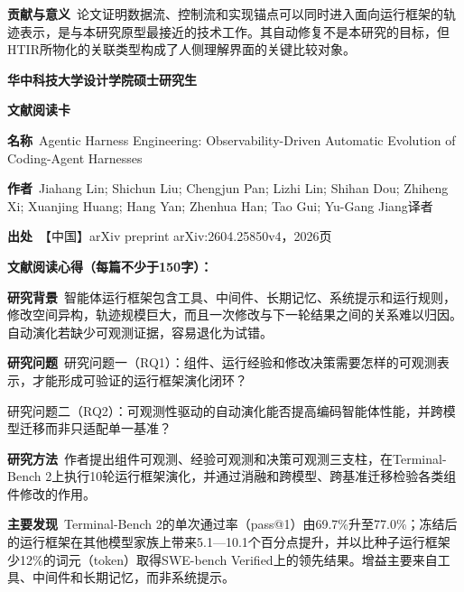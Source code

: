 \noindent\textbf{贡献与意义}\ 论文证明数据流、控制流和实现锚点可以同时进入面向运行框架的轨迹表示，是与本研究原型最接近的技术工作。其自动修复不是本研究的目标，但HTIR所物化的关联类型构成了人侧理解界面的关键比较对象。\par
\clearpage
\begin{center}
{\songti\bfseries\fontsize{18.5pt}{27.75pt}\selectfont 华中科技大学设计学院硕士研究生\par}
{\songti\bfseries\fontsize{18.5pt}{27.75pt}\selectfont 文献阅读卡\par}
\end{center}
\vspace{0.25em}
\noindent\underline{}\par
\vspace{0.35em}
\noindent\textbf{名称}\ Agentic Harness Engineering: Observability-Driven Automatic Evolution of Coding-Agent Harnesses\par
\noindent\textbf{作者}\ Jiahang Lin; Shichun Liu; Chengjun Pan; Lizhi Lin; Shihan Dou; Zhiheng Xi; Xuanjing Huang; Hang Yan; Zhenhua Han; Tao Gui; Yu-Gang Jiang\quad 译者\par
\noindent\textbf{出处}\ 【中国】arXiv preprint arXiv:2604.25850v4，2026\quad 页\par
\vspace{0.35em}
\noindent\textbf{文献阅读心得（每篇不少于150字）：}\par
\noindent\textbf{研究背景}\ 智能体运行框架包含工具、中间件、长期记忆、系统提示和运行规则，修改空间异构，轨迹规模巨大，而且一次修改与下一轮结果之间的关系难以归因。自动演化若缺少可观测证据，容易退化为试错。\par
\noindent\textbf{研究问题}\ 研究问题一（RQ1）：组件、运行经验和修改决策需要怎样的可观测表示，才能形成可验证的运行框架演化闭环？\par
研究问题二（RQ2）：可观测性驱动的自动演化能否提高编码智能体性能，并跨模型迁移而非只适配单一基准？\par
\noindent\textbf{研究方法}\ 作者提出组件可观测、经验可观测和决策可观测三支柱，在Terminal-Bench 2上执行10轮运行框架演化，并通过消融和跨模型、跨基准迁移检验各类组件修改的作用。\par
\noindent\textbf{主要发现}\ Terminal-Bench 2的单次通过率（pass@1）由69.7\%升至77.0\%；冻结后的运行框架在其他模型家族上带来5.1—10.1个百分点提升，并以比种子运行框架少12\%的词元（token）取得SWE-bench Verified上的领先结果。增益主要来自工具、中间件和长期记忆，而非系统提示。\par
